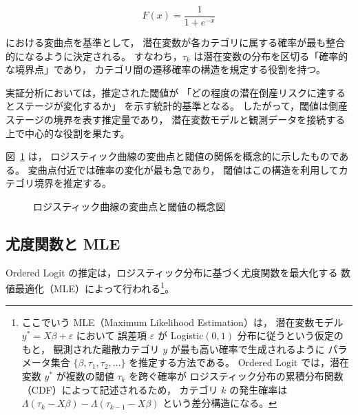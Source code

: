 \[
F(x)=\frac{1}{1+e^{-x}}
\]



における変曲点を基準として，
潜在変数が各カテゴリに属する確率が最も整合的になるように決定される。
すなわち，$\tau_k$ は潜在変数の分布を区切る「確率的な境界点」であり，
カテゴリ間の遷移確率の構造を規定する役割を持つ。

実証分析においては，推定された閾値が
「どの程度の潜在倒産リスクに達するとステージが変化するか」
を示す統計的基準となる。
したがって，閾値は倒産ステージの境界を表す推定量であり，
潜在変数モデルと観測データを接続する上で中心的な役割を果たす。

図~\ref{fig:cutpoint_logistic} は，
ロジスティック曲線の変曲点と閾値の関係を概念的に示したものである。
変曲点付近では確率の変化が最も急であり，
閾値はこの構造を利用してカテゴリ境界を推定する。

\begin{figure}[H]
\centering
{}
\caption{ロジスティック曲線の変曲点と閾値の概念図}
\label{fig:cutpoint_logistic}
\end{figure}



\subsection{尤度関数と MLE}

Ordered Logit の推定は，ロジスティック分布に基づく尤度関数を最大化する
数値最適化（MLE）によって行われる\footnote{
ここでいう MLE（Maximum Likelihood Estimation）は，
潜在変数モデル $y^* = X\beta + \varepsilon$ において
誤差項 $\varepsilon$ が Logistic$(0,1)$ 分布に従うという仮定のもと，
観測された離散カテゴリ $y$ が最も高い確率で生成されるように
パラメータ集合 $\{\beta, \tau_1, \tau_2, \dots\}$ を推定する方法である。
Ordered Logit では，潜在変数 $y^*$ が複数の閾値 $\tau_k$ を跨ぐ確率が
ロジスティック分布の累積分布関数（CDF）によって記述されるため，
カテゴリ $k$ の発生確率は
$\Lambda(\tau_k - X\beta) - \Lambda(\tau_{k-1} - X\beta)$
という差分構造になる。
}。


